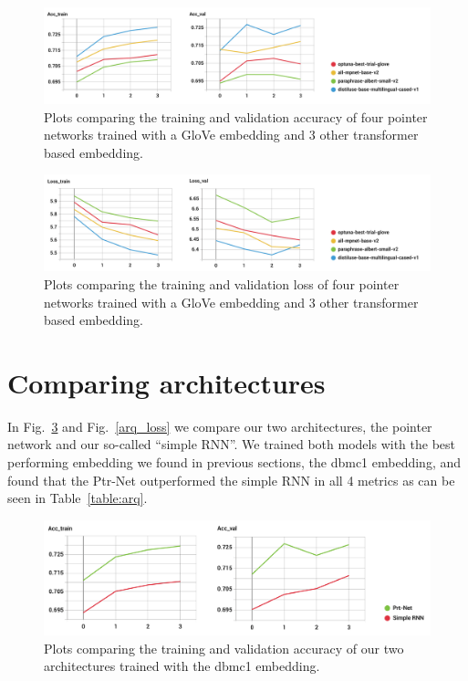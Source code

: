 \begin{figure}[!ht]
\centerline{\includegraphics[width=1.1\textwidth]{figuras/glove_vs_transformer_-ACC.png}   }
\caption{Plots comparing the training and validation accuracy of four pointer networks trained with a GloVe embedding and 3 other transformer based embedding.}
\label{glove_acc}
\end{figure}

\begin{figure}[!ht]
\centerline{\includegraphics[width=1.1\textwidth]{figuras/glove_vs_transformer_-Loss.png}} 
\caption{Plots comparing the training and validation loss of four pointer networks trained with a GloVe embedding and 3 other transformer based embedding.}
\label{glove_loss}
\end{figure}




\section{Comparing architectures}

 
In Fig.~\ref{arq_acc} and Fig.~\ref{arq_loss} we compare our two architectures, the pointer network and our so-called ``simple RNN''. We trained both models with the best performing embedding we found in previous sections, the dbmc1 embedding, and found that the Ptr-Net outperformed the simple RNN in all 4 metrics as can be seen in Table~\ref{table:arq}. 


\begin{figure}[!ht]
\centerline{\includegraphics[width=1.1\textwidth]{figuras/arquiteturas_-ACC.png}   }
\caption{Plots comparing the training and validation accuracy of our two architectures trained with the  dbmc1 embedding.}
\label{arq_acc}
\end{figure}

